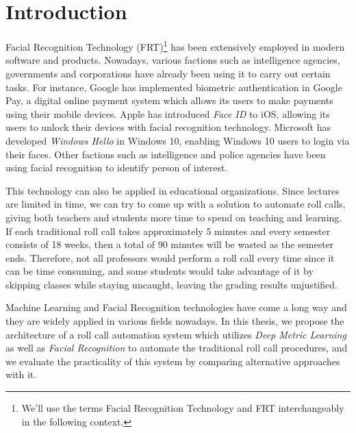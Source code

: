 \chapter{Introduction}
Facial Recognition Technology (FRT)\footnote{We'll use the terms Facial Recognition Technology and FRT interchangeably in the following context.}
has been extensively employed in modern software and products. Nowadays, various factions such as intelligence agencies, governments
and corporations have already been using it to carry out certain tasks. For instance, Google has implemented biometric authentication
in Google Pay, a digital online payment system which allows its users to make payments using their mobile devices.
Apple has introduced \emph{Face ID} to iOS, allowing its users to unlock their devices with facial recognition technology.
Microsoft has developed \emph{Windows Hello} in Windows 10, enabling Windows 10 users to login via their faces.
Other factions such as intelligence and police agencies have been using facial recognition to identify person of interest.

This technology can also be applied in educational organizations. Since lectures are limited in time, we can try to come up
with a solution to automate roll calls, giving both teachers and students more time to spend on teaching and learning.
If each traditional roll call takes approximately 5 minutes and every semester consists of 18 weeks, then a total of 90 minutes
will be wasted as the semester ends. Therefore, not all professors would perform a roll call every time since it can be time consuming,
and some students would take advantage of it by skipping classes while staying uncaught, leaving the grading results unjustified.

Machine Learning and Facial Recognition technologies have come a long way and they are widely applied in various fields nowadays.
In this thesis, we propose the architecture of a roll call automation system which utilizes \emph{Deep Metric Learning} as well as
\emph{Facial Recognition} to automate the traditional roll call procedures, and we evaluate the practicality of this system 
by comparing alternative approaches with it.




